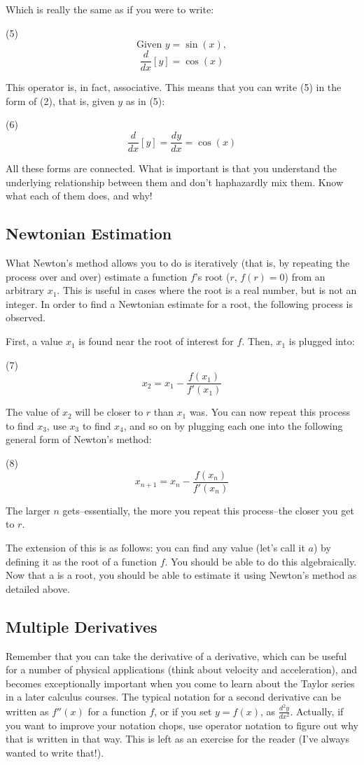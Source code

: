 \documentclass[12pt]{amsart}
\begin{document}
Which is really the same as if you were to write:

(5) $$\text{Given } y = \sin(x),$$
$$\frac{d}{dx}[y] = \cos(x)$$

This operator is, in fact, associative. This means that you can write (5) in the form of (2), that is, given $y$ as in (5):

(6) $$\frac{d}{dx}[y] = \frac{dy}{dx} = \cos(x)$$

All these forms are connected. What is important is that you understand the underlying relationship between them and don't haphazardly mix them. Know what each of them does, and why!

\subsection{Newtonian Estimation}

What Newton's method allows you to do is iteratively (that is, by repeating the process over and over) estimate a function $f$'s root ($r$, $f(r) = 0$) from an arbitrary $x_1$. This is useful in cases where the root is a real number, but is not an integer. In order to find a Newtonian estimate for a root, the following process is observed.

First, a value $x_1$ is found near the root of interest for $f$. Then, $x_1$ is plugged into:

(7) $$ x_2 = x_1 - \frac{f(x_1)}{f'(x_1)}$$

The value of $x_2$ will be closer to $r$ than $x_1$ was. You can now repeat this process to find $x_3$, use $x_3$ to find $x_4$, and so on by plugging each one into the following general form of Newton's method:

(8) $$ x_{n+1} = x_n - \frac{f(x_n)}{f'(x_n)}$$

The larger $n$ gets--essentially, the more you repeat this process--the closer you get to $r$. 

The extension of this is as follows: you can find any value (let's call it $a$) by defining it as the root of a function $f$. You should be able to do this algebraically. Now that a is a root, you should be able to estimate it using Newton's method as detailed above.

\subsection{Multiple Derivatives}

Remember that you can take the derivative of a derivative, which can be useful for a number of physical applications (think about velocity and acceleration), and becomes exceptionally important when you come to learn about the Taylor series in a later calculus courses. The typical notation for a second derivative can be written as $f''(x)$ for a function $f$, or if you set $y = f(x)$, as $\frac{d^2y}{dx^2}$. Actually, if you want to improve your notation chops, use operator notation to figure out why that is written in that way. This is left as an exercise for the reader (I've always wanted to write that!).
\end{document}
